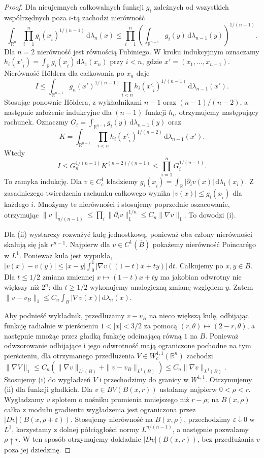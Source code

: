 \begin{proof}
Dla nieujemnych całkowalnych funkcji $g_i$ zależnych od
wszystkich współrzędnych poza $i$-tą zachodzi nierówność
\[
 \int_{\mathbb R^n}\prod_{i=1}^n
 g_i(x_{\widehat i})^{1/(n-1)}\,\mathrm d\lambda_n(x)
 \le\prod_{i=1}^n
 \left(\int_{\mathbb R^{n-1}}g_i(y)\,
 \mathrm d\lambda_{n-1}(y)\right)^{1/(n-1)}.
\]
Dla $n=2$ nierówność jest równością Fubiniego.
W kroku indukcyjnym oznaczamy
$h_i(x'_{\widehat i})=\int_{\mathbb R}
 g_i(x_{\widehat i})\,\mathrm d\lambda_1(x_n)$
przy $i<n$, gdzie $x'=(x_1,\ldots,x_{n-1})$.
Nierówność Höldera dla całkowania po $x_n$ daje
\[
 I\le\int_{\mathbb R^{n-1}}g_n(x')^{1/(n-1)}
 \prod_{i<n}h_i(x'_{\widehat i})^{1/(n-1)}
 \,\mathrm d\lambda_{n-1}(x').
\]
Stosując ponownie Höldera, z wykładnikami
$n-1$ oraz $(n-1)/(n-2)$, a następnie
założenie indukcyjne dla $(n-1)$ funkcji $h_i$,
otrzymujemy następujący rachunek. Oznaczmy
$G_i=\int_{\mathbb R^{n-1}}g_i(y)\,
\mathrm d\lambda_{n-1}(y)$ oraz
\[
 K=\int_{\mathbb R^{n-1}}\prod_{i<n}
 h_i(x'_{\widehat i})^{1/(n-2)}
 \,\mathrm d\lambda_{n-1}(x').
\]
Wtedy
\[
 I\le G_n^{1/(n-1)}K^{(n-2)/(n-1)}
 \le\prod_{i=1}^n G_i^{1/(n-1)}.
\]
To zamyka indukcję.
Dla $v\in C_c^1$ kładziemy
$g_i(x_{\widehat i})=\int_{\mathbb R}
|\partial_i v(x)|\,\mathrm d\lambda_1(x_i)$.
Z zasadniczego twierdzenia rachunku całkowego wynika
$|v(x)|\le g_i(x_{\widehat i})$ dla każdego $i$.
Mnożymy te nierówności i stosujemy poprzednie
oszacowanie, otrzymując
$\|v\|_{n/(n-1)}\le\prod_i\|\partial_i v\|_1^{1/n}
\le C_n\|\nabla v\|_1$. To dowodzi (i).

Dla (ii) wystarczy rozważyć kulę jednostkową,
ponieważ oba człony nierówności skalują się jak
$r^{n-1}$. Najpierw dla $v\in C^1(\overline B)$
pokażemy nierówność Poincarégo w $L^1$.
Ponieważ kula jest wypukła,
$|v(x)-v(y)|\le|x-y|\int_0^1
|\nabla v((1-t)x+ty)|\,\mathrm dt$.
Całkujemy po $x,y\in B$. Dla $t\le1/2$ zmiana
zmiennej $x\mapsto(1-t)x+ty$ ma jakobian odwrotny
nie większy niż $2^n$; dla $t\ge1/2$ wykonujemy
analogiczną zmianę względem $y$. Zatem
$\|v-v_B\|_1\le C_n\int_B|\nabla v(x)|\,\mathrm d\lambda_n(x)$.

Aby podnieść wykładnik, przedłużamy $v-v_B$
na nieco większą kulę, odbijając funkcję radialnie
w pierścieniu $1<|x|<3/2$ za pomocą
$(r,\theta)\mapsto(2-r,\theta)$, a następnie
mnożąc przez gładką funkcję odcinającą równą $1$
na $B$. Ponieważ odwzorowanie odbijające i jego
odwrotność mają ograniczone pochodne na tym pierścieniu,
dla otrzymanego przedłużenia $V\in W^{1,1}_c(\mathbb R^n)$
zachodzi
$\|\nabla V\|_1\le C_n(\|\nabla v\|_{L^1(B)}+
\|v-v_B\|_{L^1(B)})\le C_n\|\nabla v\|_{L^1(B)}$.
Stosujemy (i) do wygładzeń $V$ i przechodzimy do
granicy w $W^{1,1}$. Otrzymujemy (ii) dla funkcji
gładkich. Dla $v\in BV(B(x,r))$ ustalamy najpierw
$0<\rho<r$. Wygładzamy $v$ splotem o nośniku
promienia mniejszego niż $r-\rho$; na $B(x,\rho)$
całka z modułu gradientu wygładzenia jest
ograniczona przez $|Dv|(B(x,\rho+\varepsilon))$.
Stosujemy nierówność na $B(x,\rho)$, przechodzimy
$\varepsilon\downarrow0$ w $L^1$, korzystamy z
dolnej półciągłości normy $L^{n/(n-1)}$, a
następnie pozwalamy $\rho\uparrow r$. W ten
sposób otrzymujemy dokładnie $|Dv|(B(x,r))$,
bez przedłużania $v$ poza jej dziedzinę.


\end{proof}
